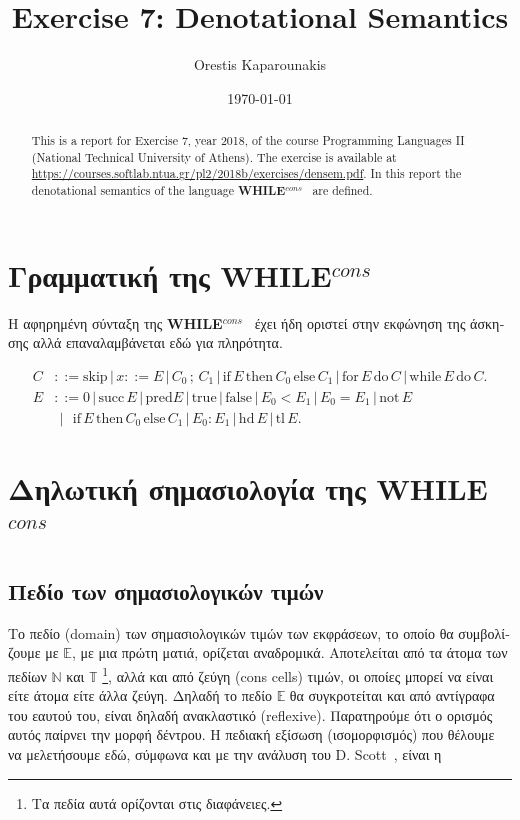 \documentclass[12pt]{article}
\title{Exercise 7: Denotational Semantics}
\author{Orestis Kaparounakis}
\date{\today}
\newcommand{\whilelang}{\textrm{\textbf{WHILE}$^{cons}$\ }}
\begin{document}
\maketitle
\begin{abstract}
    This is a report for Exercise 7, year 2018, of the course Programming
    Languages II (National Technical University of Athens).
    The exercise is available at \url{https://courses.softlab.ntua.gr/pl2/2018b/exercises/densem.pdf}.
    In this report the denotational semantics of the language \whilelang
    are defined.
\end{abstract}
\section{\textgreek{Γραμματική της} \whilelang}
\textgreek{Η αφηρημένη σύνταξη της} \whilelang
\textgreek{έχει ήδη οριστεί στην εκφώνηση της άσκησης αλλά
επαναλαμβάνεται εδώ για πληρότητα}. 

\vspace{-1em}
\begin{align*}
  C &::= \textrm{skip} \,|\, x ::= E \,|\, C_0\,;\,C_1
  \,|\, \textrm{if}\, E\, \textrm{then}\, C_0\, \textrm{else}\, C_1 
  \,|\, \textrm{for}\, E \, \textrm{do} \, C
  \,|\, \textrm{while}\, E\, \textrm{do}\, C. \\
  E &::= \textrm{0}  \,|\, \textrm{succ}\, E  \,|\, \textrm{pred} E
  \,|\, \textrm{true}  \,|\, \textrm{false}  \,|\, E_0 < E_1
  \,|\, E_0 = E_1  \,|\, \textrm{not}\, E \\
  &~\,|~~~ \textrm{if}\, E\, \textrm{then}\, C_0\, \textrm{else}\, C_1
  \,|\,E_0 : E_1  \,|\, \textrm{hd}\, E  \,|\, \textrm{tl}\, E.
\end{align*}


\section{\textgreek{Δηλωτική σημασιολογία της} \whilelang}
\subsection{\textgreek{Πεδίο των σημασιολογικών τιμών}}
\textgreek{Το πεδίο} (domain) \textgreek{των σημασιολογικών τιμών
των εκφράσεων, το οποίο θα συμβολίζουμε με $\mathbb{E}$, 
με μια πρώτη ματιά, ορίζεται αναδρομικά.
Αποτελείται από τα άτομα των πεδίων $\mathbb{N}$ και $\mathbb{T}$
\footnote{Τα πεδία αυτά ορίζονται στις διαφάνειες.}, 
αλλά και από ζεύγη} (cons cells)
\textgreek{τιμών, οι οποίες μπορεί να είναι είτε άτομα 
είτε άλλα ζεύγη. Δηλαδή το πεδίο $\mathbb{E}$ θα συγκροτείται
και από αντίγραφα του εαυτού του, είναι δηλαδή ανακλαστικό
} (reflexive).
\textgreek{Παρατηρούμε ότι ο ορισμός αυτός παίρνει την
μορφή δέντρου. Η πεδιακή εξίσωση (ισομορφισμός) που θέλουμε να μελετήσουμε εδώ,
σύμφωνα και με την ανάλυση του} D. Scott~\cite{scott1982domains},
\textgreek{είναι η}
\end{document}
